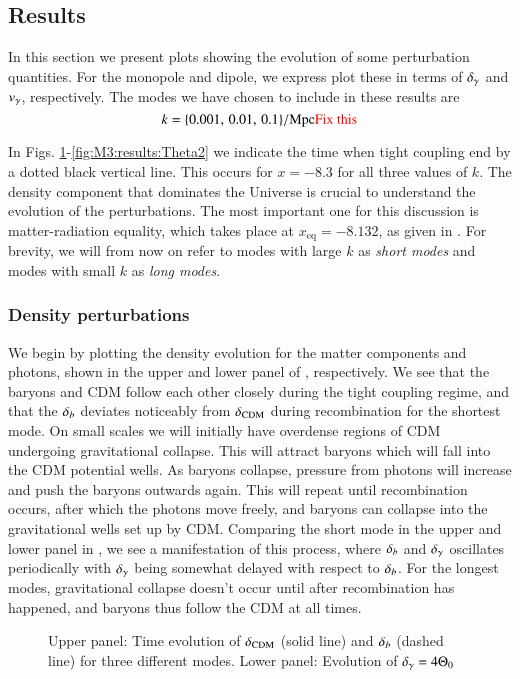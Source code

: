 \subsection{Results}\label{ssec:M3:results}

In this section we present plots showing the evolution of some perturbation quantities. For the monopole and dipole, we express plot these in terms of $\delta_\gamma$ and $v_\gamma$, respectively. The modes we have chosen to include in these results are $$k=\{ 0.001,\,0.01,\,0.1 \}/\mathrm{Mpc} \text{\textcolor{red}{ Fix this}}$$

In Figs. \ref{fig:M3:results:deltas}-\ref{fig:M3:results:Theta2} we indicate the time when tight coupling end by a dotted black vertical line. This occurs for $x=-8.3$ for all three values of $k$. The density component that dominates the Universe is crucial to understand the evolution of the perturbations. The most important one for this discussion is matter-radiation equality, which takes place at $x_\mathrm{eq}=-8.132$, as given in . For brevity, we will from now on refer to modes with large $k$ as \textit{short modes} and modes with small $k$ as \textit{long modes}.     

\subsubsection{Density perturbations} \label{sssec:M3:results:density_perturbations}
We begin by plotting the density evolution for the matter components and photons, shown in the upper and lower panel of , respectively. We see that the baryons and CDM follow each other closely during the tight coupling regime, and that the $\delta_b$ deviates noticeably from $\delta_\mathrm{CDM}$ during recombination for the shortest mode. On small scales we will initially have overdense regions of CDM undergoing gravitational collapse. This will attract baryons which will fall into the CDM potential wells. As baryons collapse, pressure from photons will increase and push the baryons outwards again. This will repeat until recombination occurs, after which the photons move freely, and baryons can collapse into the gravitational wells set up by CDM. Comparing the short mode in the upper and lower panel in , we see a manifestation of this process, where $\delta_b$ and $\delta_\gamma$ oscillates periodically with $\delta_\gamma$ being somewhat delayed with respect to $\delta_b$. For the longest modes, gravitational collapse doesn't occur until after recombination has happened, and baryons thus follow the CDM at all times.  
\begin{figure}[ht!]
    \caption{Upper panel: Time evolution of $\delta_\mathrm{CDM}$ (solid line) and $\delta_b$ (dashed line) for three different modes. Lower panel: Evolution of $\delta_\gamma=4\Theta_0$}
    \label{fig:M3:results:deltas}
\end{figure}



